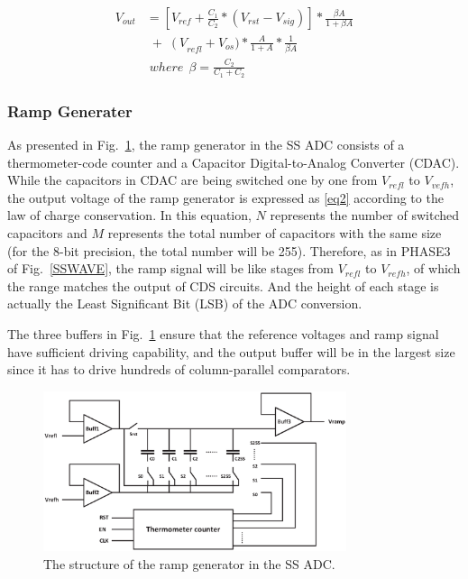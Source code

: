 \begin{equation}
	\begin{aligned}
		V_{out}&=\left[ V_{ref}+\frac{C_1}{C_2}\ast\left(V_{rst}-V_{sig}\right)\right]\ast\frac{\beta A}{1+\beta A}\\
		&\;{+}\;\left(V\right._{refl}+V_{os})\ast\frac{A}{1+A}\ast\frac{1}{\beta A}\\
		&\;where\ \ \beta=\frac{C_2}{C_1+C_2}
		\label{eq1}
	\end{aligned}
\end{equation}

\subsubsection{Ramp Generater}

As presented in Fig.~\ref{RAMP}, the ramp generator in the SS ADC consists of a thermometer-code counter and a Capacitor Digital-to-Analog Converter (CDAC). 
While the capacitors in CDAC are being switched one by one from $V_{refl}$ to $V_{vefh}$, the output voltage of the ramp generator is expressed as \eqref{eq2} according to the law of charge conservation. 
In this equation, $N$ represents the number of switched capacitors and $M$ represents the total number of capacitors with the same size (for the 8-bit precision, the total number will be 255). 
Therefore, as in PHASE3 of Fig.~\ref{SSWAVE}, the ramp signal will be like stages from $V_{refl}$ to $V_{refh}$, of which the range matches the output of CDS circuits. 
And the height of each stage is actually the Least Significant Bit (LSB) of the ADC conversion.

The three buffers in Fig.~\ref{RAMP} ensure that the reference voltages and ramp signal have sufficient driving capability, 
and the output buffer will be in the largest size since it has to drive hundreds of column-parallel comparators.

\begin{figure}[htbp]
	\centerline{\includegraphics[width=3.5in]{./Figures/RAMP.eps}}
	\caption{The structure of the ramp generator in the SS ADC.}
	\label{RAMP}
\end{figure} 

